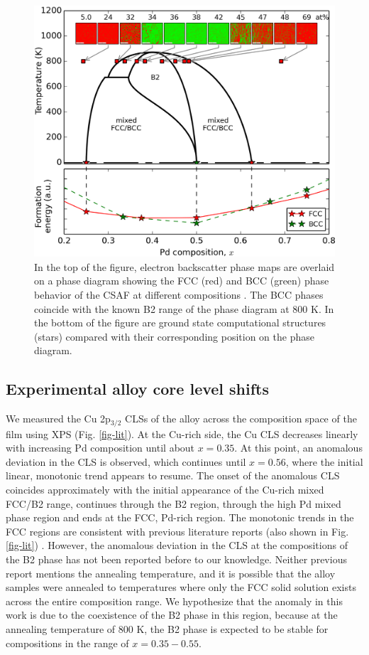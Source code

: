 \documentclass[number, sort&compress, review, 12pt]{elsarticle}
\begin{document}
\begin{figure}[H]
\centering
\includegraphics[width=6in]{./images/phase.png}
\caption{\label{fig-phase}In the top of the figure, electron backscatter phase maps are overlaid on a phase diagram showing the FCC (red) and BCC (green) phase behavior of the CSAF at different compositions \cite{subramanian-1991-cu-pd-pallad}. The BCC phases coincide with the known B2 range of the phase diagram at 800 K. In the bottom of the figure are ground state computational structures (stars) compared with their corresponding position on the phase diagram.}
\end{figure}

\subsection{Experimental alloy core level shifts}
\label{sec-3-2}
We measured the Cu 2p$_{\text{3/2}}$ CLSs of the alloy across the composition space of the film using XPS (Fig. \ref{fig-lit}). At the Cu-rich side, the Cu CLS decreases linearly with increasing Pd composition until about $x = 0.35$. At this point, an anomalous deviation in the CLS is observed, which continues until $x = 0.56$, where the initial linear, monotonic trend appears to resume. The onset of the anomalous CLS coincides approximately with the initial appearance of the Cu-rich  mixed FCC/B2 range, continues through the B2 region, through the high Pd mixed phase region and ends at the FCC, Pd-rich region. The monotonic trends in the FCC regions are consistent with previous literature reports (also shown in Fig. \ref{fig-lit}) \cite{cole-1997-deter-charg,martensson-1981-elect-cu}. However, the anomalous deviation in the CLS at the compositions of the B2 phase has not been reported before to our knowledge. Neither previous report mentions the annealing temperature, and it is possible that the alloy samples were annealed to temperatures where only the FCC solid solution exists across the entire composition range. We hypothesize that the anomaly in this work is due to the coexistence of the B2 phase in this region, because at the annealing temperature of 800 K, the B2 phase is expected to be stable for compositions in the range of $x=0.35-0.55$.
\end{document}
